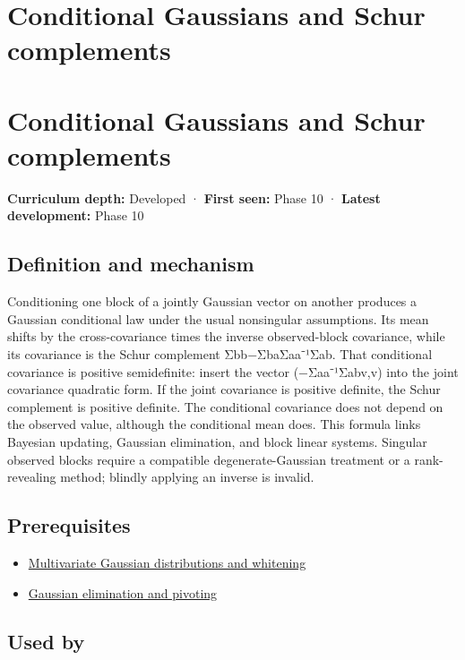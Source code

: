 \hypertarget{appendix-f0437ea55a47}{}
\section*{Conditional Gaussians and Schur complements}
\section{Conditional Gaussians and Schur complements}\label{conditional-gaussians-and-schur-complements}

\textbf{Curriculum depth:} Developed · \textbf{First seen:} Phase 10 · \textbf{Latest development:} Phase 10

\subsection{Definition and mechanism}\label{definition-and-mechanism}

Conditioning one block of a jointly Gaussian vector on another produces a Gaussian conditional law under the usual nonsingular assumptions. Its mean shifts by the cross-covariance times the inverse observed-block covariance, while its covariance is the Schur complement Σbb−ΣbaΣaa⁻¹Σab. That conditional covariance is positive semidefinite: insert the vector (−Σaa⁻¹Σabv,v) into the joint covariance quadratic form. If the joint covariance is positive definite, the Schur complement is positive definite. The conditional covariance does not depend on the observed value, although the conditional mean does. This formula links Bayesian updating, Gaussian elimination, and block linear systems. Singular observed blocks require a compatible degenerate-Gaussian treatment or a rank-revealing method; blindly applying an inverse is invalid.

\subsection{Prerequisites}\label{prerequisites}

\begin{itemize}
\tightlist
\item
  \hyperref[appendix-12bbe185dbe5]{Multivariate Gaussian distributions and whitening}
\item
  \hyperref[appendix-f6e77f4a200f]{Gaussian elimination and pivoting}
\end{itemize}

\subsection{Used by}\label{used-by}

